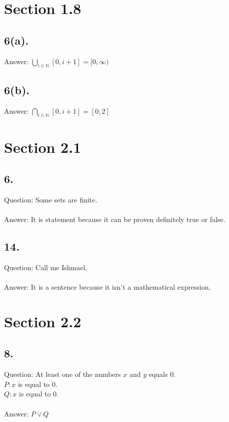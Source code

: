 \documentclass[12pt]{article}
\begin{document}
\begin{minipage}[t]{0.40\textwidth}
	\section*{Section 1.8}
\subsection*{6(a).}
Answer:
$\bigcup\limits_{ i \in \mathbb{N}}[0,i+1]=[0,\infty)$


\subsection*{6(b).}
Answer:
$\bigcap\limits_{ i \in \mathbb{N}}[0,i+1]=[0,2]$

\section*{Section 2.1}
\subsection*{6.}
Question: Some sets are finite.
\\\\
Answer: It is statement because it can be proven definitely true or false.


\subsection*{14.}
Question: Call me Ishmael.
\\\\
Answer: It is a sentence because it isn't a mathematical expression. 

\section*{Section 2.2}
\subsection*{8.}
Question: At least one of the 
numbers $ x $ and $ y $ equals $ 0 $.
\\
$ P: x $ is equal to 0.\\
$ Q: x $ is equal to 0.\\\\
Answer: $ P\lor Q $

\end{minipage}
\end{document}
